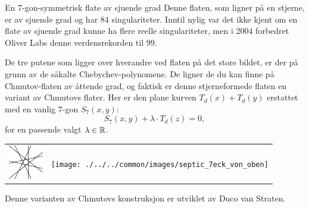 \begin{surferPage}{En 7-gon-symmetrisk flate av sjuende grad}
Denne flaten, som ligner på en stjerne, er av sjuende grad og har $84$ singulariteter. Inntil nylig var det ikke kjent om en flate av sjuende grad kunne ha flere reelle singulariteter, men i 2004 forbedret Oliver Labs denne verdensrekorden til $99$. 
  
  
 De tre putene som ligger over hverandre ved flaten på det store bildet, er der på grunn av de såkalte Chebychev-polynomene. De ligner de du kan finne på Chmutov-flaten av åttende grad, og faktisk er denne stjerneformede flaten en variant av Chmutovs flater. Her er den plane kurven $T_d(x)+T_d(y)$ erstattet med en vanlig $7$-gon  $S_7(x,y)$: 
   \[S_7(x,y) + \lambda \cdot T_d(z) = 0,\]
   for en passende valgt $\lambda\in{\mathbb R}$. 
    \vspace*{-0.3em}
    \begin{center}
      \begin{tabular}{c@{\qquad}c}
        \includegraphics[height=1.5cm]{./../../common/images/labsseptic1.pdf}
        &
        \texttt{[image: ./../../common/images/septic\_7eck\_von\_oben]}
      \end{tabular}
    \end{center}
    \vspace*{-0.3em}   
   Denne varianten av Chmutovs konstruksjon er utviklet av Duco van Straten.
\end{surferPage}
